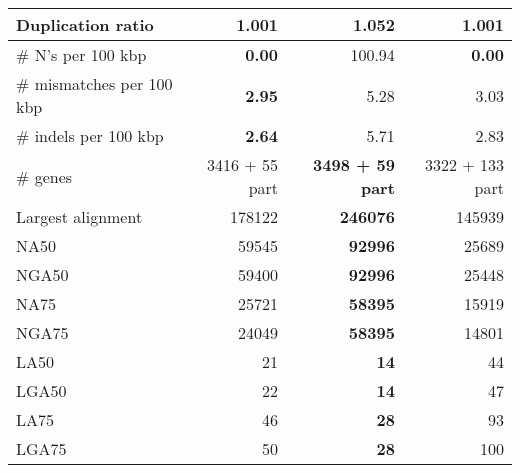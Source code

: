 \documentclass[12pt,a4paper]{article}
\begin{document}
\begin{table}[ht]
\begin{center}
\begin{tabular}{|l*{3}{|r}|}
Duplication ratio & {\bf 1.001} & 1.052 & {\bf 1.001} \\ \hline
\# N's per 100 kbp & {\bf 0.00} & 100.94 & {\bf 0.00} \\ \hline
\# mismatches per 100 kbp & {\bf 2.95} & 5.28 & 3.03 \\ \hline
\# indels per 100 kbp & {\bf 2.64} & 5.71 & 2.83 \\ \hline
\# genes & 3416 + 55 part & {\bf 3498 + 59 part} & 3322 + 133 part \\ \hline
Largest alignment & 178122 & {\bf 246076} & 145939 \\ \hline
NA50 & 59545 & {\bf 92996} & 25689 \\ \hline
NGA50 & 59400 & {\bf 92996} & 25448 \\ \hline
NA75 & 25721 & {\bf 58395} & 15919 \\ \hline
NGA75 & 24049 & {\bf 58395} & 14801 \\ \hline
LA50 & 21 & {\bf 14} & 44 \\ \hline
LGA50 & 22 & {\bf 14} & 47 \\ \hline
LA75 & 46 & {\bf 28} & 93 \\ \hline
LGA75 & 50 & {\bf 28} & 100 \\ \hline
\end{tabular}
\end{center}
\end{table}
\end{document}
